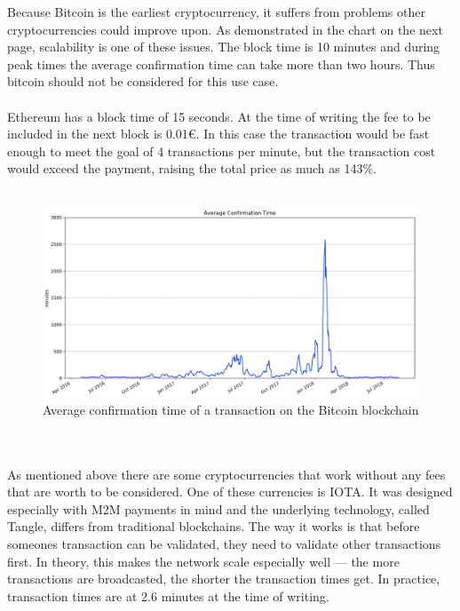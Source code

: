 Because Bitcoin is the earliest cryptocurrency, it suffers from problems other cryptocurrencies could improve upon. As demonstrated in the chart on the next page, scalability is one of these issues. The block time is 10 minutes\cite{bitcoin-whitepaper} and during peak times the average confirmation time can take more than two hours. Thus bitcoin should not be considered for this use case.
\\\\
Ethereum has a block time of 15 seconds. At the time of writing the fee to be included in the next block is 0.01\euro\cite{ethereum-fee}. In this case the transaction would be fast enough to meet the goal of 4 transactions per minute, but the transaction cost would exceed the payment, raising the total price as much as 143\%.
\\\\
\begin{figure}[h]
    \includegraphics[width=\textwidth]{img/average-confirmation-time.png}
    \caption{Average confirmation time of a transaction on the Bitcoin blockchain\cite{btc-conf-time}}
    \label{fig:BitcoinConfirmationTime}
\end{figure}
\\\\
As mentioned above there are some cryptocurrencies that work without any fees that are worth to be considered. One of these currencies is IOTA. It was designed especially with M2M payments in mind and the underlying technology, called Tangle, differs from traditional blockchains. The way it works is that before someones transaction can be validated, they need to validate other transactions first\cite{tangle}. In theory, this makes the network scale especially well — the more transactions are broadcasted, the shorter the transaction times get. In practice, transaction times are at 2.6 minutes at the time of writing\cite{iota-time}.
\\\\
